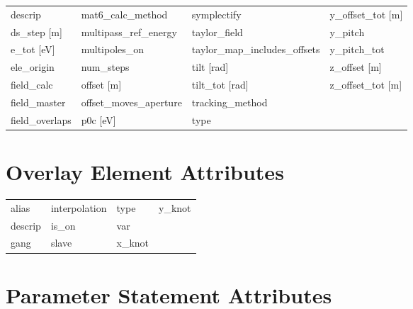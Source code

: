 \begin{tabular}{llll}
descrip                          & mat6_calc_method                 & symplectify                      & y_offset_tot [m]                 \\
ds_step [m]                      & multipass_ref_energy             & taylor_field                     & y_pitch                          \\
e_tot [eV]                       & multipoles_on                    & taylor_map_includes_offsets      & y_pitch_tot                      \\
ele_origin                       & num_steps                        & tilt [rad]                       & z_offset [m]                     \\
field_calc                       & offset [m]                       & tilt_tot [rad]                   & z_offset_tot [m]                 \\
field_master                     & offset_moves_aperture            & tracking_method                  &                                  \\
field_overlaps                   & p0c [eV]                         & type                             &                                  \\
 \bottomrule
 \end{tabular}
 \vfill
 
 \section{Overlay Element Attributes}
 \label{s:list.overlay}
 
 \begin{tabular}{llll} \toprule
alias                            & interpolation                    & type                             & y_knot                           \\
descrip                          & is_on                            & var                              &                                  \\
gang                             & slave                            & x_knot                           &                                  \\
 \bottomrule
 \end{tabular}
 \vfill
 
 \section{Parameter Statement Attributes}
 \label{s:list.parameter}
 
